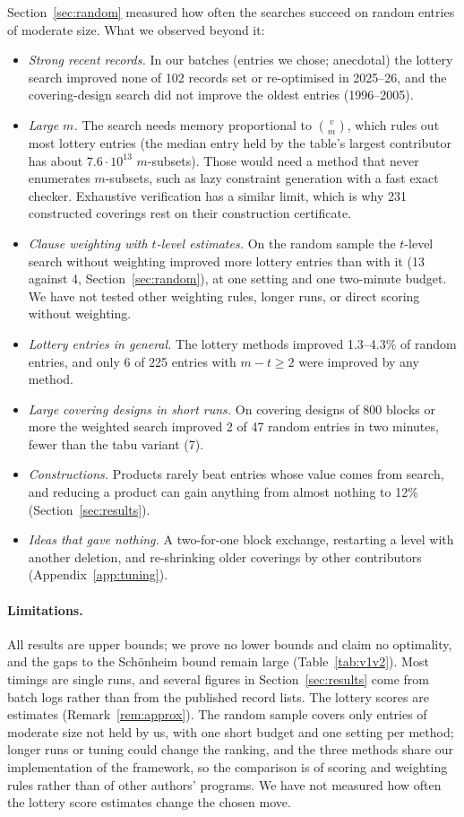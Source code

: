 \documentclass[11pt]{article}
\theoremstyle{remark}
\begin{document}
Section~\ref{sec:random} measured how often the searches succeed on random entries of moderate size. What we observed
beyond it:
\begin{itemize}
\item \emph{Strong recent records.} In our batches (entries we chose; anecdotal) the lottery search improved none of
102 records set or re-optimised in 2025--26, and the covering-design search did not improve the oldest entries
(1996--2005).
\item \emph{Large $m$.} The search needs memory proportional to $\binom{v}{m}$, which rules out most lottery entries
(the median entry held by the table's largest contributor has about $7.6\cdot 10^{13}$ $m$-subsets). Those would need a
method that never enumerates $m$-subsets, such as lazy constraint generation with a fast exact checker. Exhaustive
verification has a similar limit, which is why 231 constructed coverings rest on their construction certificate.
\item \emph{Clause weighting with $t$-level estimates.} On the random sample the $t$-level search without weighting
improved more lottery entries than with it (13 against 4, Section~\ref{sec:random}), at one setting and one two-minute
budget. We have not tested other weighting rules, longer runs, or direct scoring without weighting.
\item \emph{Lottery entries in general.} The lottery methods improved 1.3--4.3\% of random entries, and only 6 of 225
entries with $m-t\ge 2$ were improved by any method.
\item \emph{Large covering designs in short runs.} On covering designs of 800 blocks or more the weighted search
improved 2 of 47 random entries in two minutes, fewer than the tabu variant (7).
\item \emph{Constructions.} Products rarely beat entries whose value comes from search, and reducing a product can
gain anything from almost nothing to 12\% (Section~\ref{sec:results}).
\item \emph{Ideas that gave nothing.} A two-for-one block exchange, restarting a level with another deletion, and
re-shrinking older coverings by other contributors (Appendix~\ref{app:tuning}).
\end{itemize}

\paragraph{Limitations.} All results are upper bounds; we prove no lower bounds and claim no optimality, and the gaps
to the Sch\"onheim bound remain large (Table~\ref{tab:v1v2}). Most timings are single runs, and several figures in
Section~\ref{sec:results} come from batch logs rather than from the published record lists. The lottery scores are
estimates (Remark~\ref{rem:approx}). The random sample covers only entries of moderate size not held by us, with one
short budget and one setting per method; longer runs or tuning could change the ranking, and the three methods share
our implementation of the framework, so the comparison is of scoring and weighting rules rather than of other
authors' programs. We have not measured how often the lottery score estimates change the chosen move.
\end{document}
